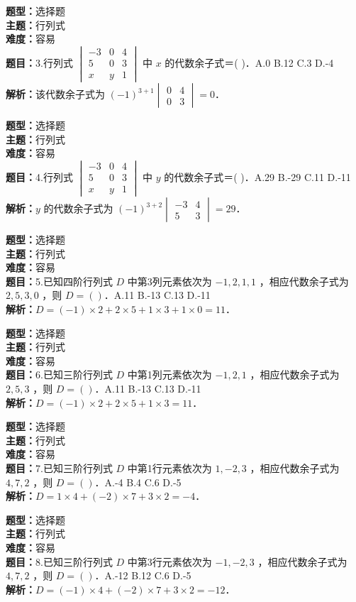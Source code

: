 \documentclass{ctexart}
\newenvironment{question}[5]{%
	\noindent\textbf{题型：}#1\\
	\textbf{主题：}#2\\
	\textbf{难度：}#3\\
	\textbf{题目：}#4\\
	\textbf{解析：}#5\\
	\vspace{1em}
}{}
\begin{document}
	\begin{question}
		{选择题}
		{行列式}
		{容易}
		{3.行列式 $\begin{vmatrix}-3 & 0 & 4 \\ 5 & 0 & 3 \\ x & y & 1\end{vmatrix}$ 中 $x$ 的代数余子式＝(  )．A.0 B.12 C.3 D.-4}
		{该代数余子式为 $(-1)^{3+1}\begin{vmatrix}0 & 4 \\ 0 & 3\end{vmatrix}=0$．}
	\end{question}
	
	\begin{question}
		{选择题}
		{行列式}
		{容易}
		{4.行列式 $\begin{vmatrix}-3 & 0 & 4 \\ 5 & 0 & 3 \\ x & y & 1\end{vmatrix}$ 中 $y$ 的代数余子式＝(  )．A.29 B.-29 C.11 D.-11}
		{$y$ 的代数余子式为 $(-1)^{3+2}\begin{vmatrix}-3 & 4 \\ 5 & 3\end{vmatrix}=29$．}
	\end{question}
	
	\begin{question}
		{选择题}
		{行列式}
		{容易}
		{5.已知四阶行列式 $D$ 中第3列元素依次为 $-1,2,1,1$ ，相应代数余子式为 $2,5,3,0$ ，则 $D=(  )$．A.11 B.-13 C.13 D.-11}
		{$D = (-1) \times 2 + 2 \times 5 + 1 \times 3 + 1 \times 0 = 11$．}
	\end{question}
	
	\begin{question}
		{选择题}
		{行列式}
		{容易}
		{6.已知三阶行列式 $D$ 中第1列元素依次为 $-1,2,1$ ，相应代数余子式为 $2,5,3$ ，则 $D=(  )$．A.11 B.-13 C.13 D.-11}
		{$D = (-1) \times 2 + 2 \times 5 + 1 \times 3 = 11$．}
	\end{question}
	
	\begin{question}
		{选择题}
		{行列式}
		{容易}
		{7.已知三阶行列式 $D$ 中第1行元素依次为 $1,-2,3$ ，相应代数余子式为 $4,7,2$ ，则 $D=(  )$．A.-4 B.4 C.6 D.-5}
		{$D = 1 \times 4 + (-2) \times 7 + 3 \times 2 = -4$．}
	\end{question}
	
	\begin{question}
		{选择题}
		{行列式}
		{容易}
		{8.已知三阶行列式 $D$ 中第3行元素依次为 $-1,-2,3$ ，相应代数余子式为 $4,7,2$ ，则 $D=(  )$．A.-12 B.12 C.6 D.-5}
		{$D = (-1) \times 4 + (-2) \times 7 + 3 \times 2 = -12$．}
	\end{question}
	
\end{document}
